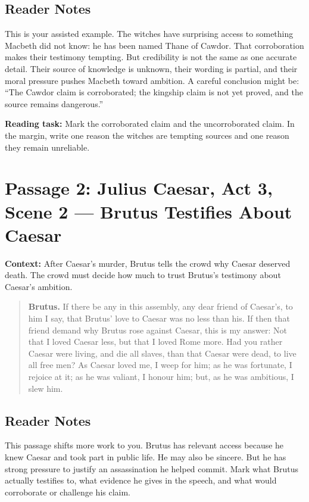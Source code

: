 \documentclass[12pt]{article}
\newenvironment{playpassage}{\begin{quote}\footnotesize\setlength{\parskip}{0.08em}\setlength{\parindent}{0pt}}{\end{quote}}
\newcommand{\speaker}[1]{\textbf{#1.}}
\begin{document}
\subsection*{Reader Notes}

This is your assisted example. The witches have surprising access to something Macbeth did not know: he has been named Thane of Cawdor. That corroboration makes their testimony tempting. But credibility is not the same as one accurate detail. Their source of knowledge is unknown, their wording is partial, and their moral pressure pushes Macbeth toward ambition. A careful conclusion might be: ``The Cawdor claim is corroborated; the kingship claim is not yet proved, and the source remains dangerous.''

\textbf{Reading task:} Mark the corroborated claim and the uncorroborated claim. In the margin, write one reason the witches are tempting sources and one reason they remain unreliable.

\newpage

\section*{Passage 2: Julius Caesar, Act 3, Scene 2 --- Brutus Testifies About Caesar}

\textbf{Context:} After Caesar's murder, Brutus tells the crowd why Caesar deserved death. The crowd must decide how much to trust Brutus's testimony about Caesar's ambition.

\begin{playpassage}
\speaker{Brutus} If there be any in this assembly, any dear friend of Caesar's, to him I say, that Brutus' love to Caesar was no less than his. If then that friend demand why Brutus rose against Caesar, this is my answer: Not that I loved Caesar less, but that I loved Rome more. Had you rather Caesar were living, and die all slaves, than that Caesar were dead, to live all free men? As Caesar loved me, I weep for him; as he was fortunate, I rejoice at it; as he was valiant, I honour him; but, as he was ambitious, I slew him.
\end{playpassage}

\subsection*{Reader Notes}

This passage shifts more work to you. Brutus has relevant access because he knew Caesar and took part in public life. He may also be sincere. But he has strong pressure to justify an assassination he helped commit. Mark what Brutus actually testifies to, what evidence he gives in the speech, and what would corroborate or challenge his claim.
\end{document}
